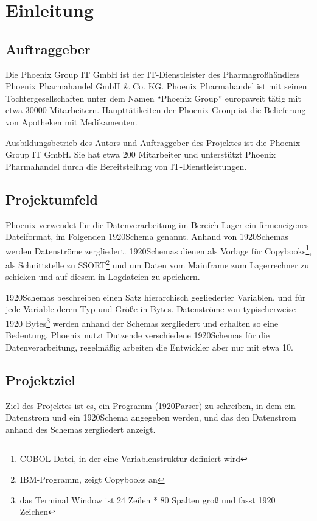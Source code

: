 \section{Einleitung}
\label{sec:Einleitung}
\subsection{Auftraggeber}
\label{sec:Auftraggeber}
Die Phoenix Group IT GmbH ist der IT-Dienstleister des Pharmagroßhändlers Phoenix Pharmahandel GmbH \& Co. KG. Phoenix Pharmahandel ist mit seinen Tochtergesellschaften unter dem Namen ``Phoenix Group'' europaweit tätig mit etwa 30000 Mitarbeitern. Haupttätikeiten der Phoenix Group ist die Belieferung von Apotheken mit Medikamenten.

Ausbildungsbetrieb des Autors und Auftraggeber des Projektes ist die Phoenix Group IT GmbH. Sie hat etwa 200 Mitarbeiter und unterstützt Phoenix Pharmahandel durch die Bereitstellung von IT-Dienstleistungen.

\subsection{Projektumfeld} 
\label{sec:Projektumfeld}
Phoenix verwendet für die Datenverarbeitung im Bereich Lager ein firmeneigenes Dateiformat, im Folgenden 1920Schema genannt. Anhand von 1920Schemas werden Datenströme zergliedert. 1920Schemas dienen als Vorlage für Copybooks\footnote{COBOL-Datei, in der eine Variablenstruktur definiert wird}, als Schnittstelle zu SSORT\footnote{IBM-Programm, zeigt Copybooks an} und um Daten vom Mainframe zum Lagerrechner zu schicken und auf diesem in Logdateien zu speichern.

1920Schemas beschreiben einen Satz hierarchisch gegliederter Variablen, und für jede Variable deren Typ und Größe in Bytes. Datenströme von typischerweise 1920 Bytes\footnote{das Terminal Window ist 24 Zeilen * 80 Spalten groß und fasst 1920 Zeichen} werden anhand der Schemas zergliedert und erhalten so eine Bedeutung. Phoenix nutzt Dutzende verschiedene 1920Schemas für die Datenverarbeitung, regelmäßig arbeiten die Entwickler aber nur mit etwa 10.

\subsection{Projektziel} 
\label{sec:Projektziel}
Ziel des Projektes ist es, ein Programm (1920Parser) zu schreiben, in dem ein Datenstrom und ein 1920Schema angegeben werden, und das den Datenstrom anhand des Schemas zergliedert anzeigt.


